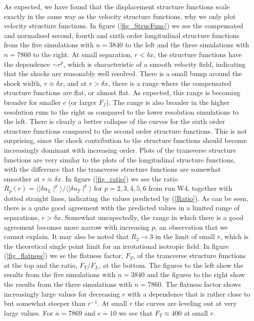  As expected, we have found that 
the displacement structure functions scale exactly in the same way as the velocity structure functions, why we only plot velocity structure functions. In figure (\ref{fig_StrucFunc}) we see the compensated and normalised second, fourth and sixth order longitudinal structure functions from the five simulations with $ n = 3840 $ to the left and the three simulations with $ n = 7860 $ to the right. At small separation, $ r < \delta x $, the structure functions have the dependence $ \sim r^{p} $, which is characteristic of a smooth velocity field, indicating that the shocks are reasonably well resolved. There is a small bump around the shock width, 
$ r \approx \delta x $, and at $ r > \delta x $, there is a range where the compensated structure functions are flat, or almost flat. As expected, this range is becoming broader for smaller  $ c $ (or larger $ F_f $). The range is also broader in the higher resolution runs to the right as compared to the lower resolution simulations to the left.  There is clearly a better collapse of the curves for the sixth order structure functions compared to the second order structure functions. This is not surprising, since the shock contribution to the structure functions should become increasingly dominant with increasing order. Plots of the transverse structure functions are very similar to the plots of the longitudinal structure functions, with the difference that the transverse structure functions are somewhat smoother at $ r \approx \delta x $. In figure (\ref{fig_ratio}) we see the ratio $ R_{p}(r) = \langle \mid \delta u_L \mid ^{p} \rangle /  \langle \mid \delta u_T \mid ^{p} \rangle$ for $ p= 2,3,4,5,6 $ from run W4, together with dotted straight lines, indicating the values predicted by (\ref{Ratio}). As can be seen, there is a quite good agreement with the predicted values in a limited range of separations, $ r > \delta x $. Somewhat unexpectedly, the range in which there is a good agreement becomes more narrow with increasing $ p $, an observation that we cannot explain. It may also be noted that $ R_2 \rightarrow 3 $ in the limit of small $ r $, which is the theoretical single point limit for an irrotational isotropic field. In figure (\ref{fig_flatness}) we se the flatness factor, $ F_T $,  of the transverse structure functions at the top and the ratio, $ F_T/F_L $,  at the bottom. The figures to the left show the results from the five simulations with  $ n = 3840 $ and the figures to the right show the results from the three simulations with $ n = 7860 $. The flatness factor  shows increasingly large values for decreasing $ r $ with a dependence that is rather close to but somewhat steeper than $ r^{-1} $. At small $ r $ the curves  are leveling out at very large values. For $ n = 7869 $ and $ c = 10 $ we see that $ F_{T} \approx 400 $ at small $ r $. 
